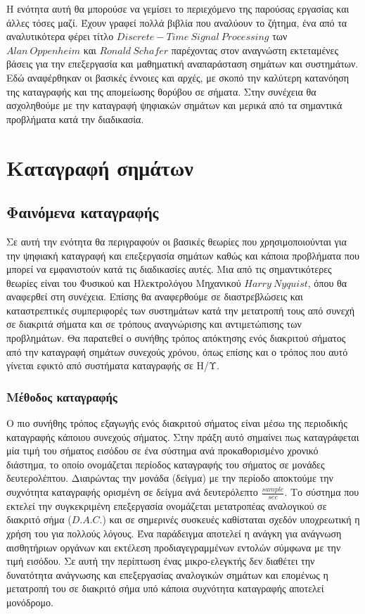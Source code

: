 \documentclass[breaklines=true, 12pt]{article}
\begin{document}
Η ενότητα αυτή θα μπορούσε να γεμίσει το περιεχόμενο της παρούσας εργασίας
και άλλες τόσες μαζί. Έχουν γραφεί πολλά βιβλία που αναλύουν το ζήτημα, ένα
από τα αναλυτικότερα φέρει τίτλο \(Discrete-Time\ Signal\ Processing\) των \(Alan\ Oppenheim\) και
\(Ronald\ Schafer\) παρέχοντας στον αναγνώστη εκτεταμένες βάσεις για την επεξεργασία
και μαθηματική αναπαράσταση σημάτων και συστημάτων. Εδώ αναφέρθηκαν οι βασικές
έννοιες και αρχές, με σκοπό την καλύτερη κατανόηση της καταγραφής και της
απομείωσης θορύβου σε σήματα. Στην συνέχεια θα ασχοληθούμε με την καταγραφή
ψηφιακών σημάτων και μερικά από τα σημαντικά προβλήματα κατά την διαδικασία.
\section{Καταγραφή σημάτων}
\label{sec:orgeb927ef}
\subsection{Φαινόμενα καταγραφής}
\label{sec:orge0922b4}
    Σε αυτή την ενότητα θα περιγραφούν οι βασικές θεωρίες που χρησιμοποιούνται
για την ψηφιακή καταγραφή και επεξεργασία σημάτων καθώς και κάποια προβλήματα
που μπορεί να εμφανιστούν κατά τις διαδικασίες αυτές. Μια από τις σημαντικότερες
θεωρίες είναι του Φυσικού και Ηλεκτρολόγου Μηχανικού \(Harry\ Nyquist\),
όπου θα αναφερθεί στη συνέχεια. Επίσης θα αναφερθούμε σε διαστρεβλώσεις
και καταστρεπτικές συμπεριφορές των συστημάτων κατά την μετατροπή τους από
συνεχή σε διακριτά σήματα και σε τρόπους αναγνώρισης και αντιμετώπισης
των προβλημάτων. Θα παρατεθεί ο συνήθης τρόπος απόκτησης ενός διακριτού σήματος
από την καταγραφή σημάτων συνεχούς χρόνου, όπως επίσης και ο τρόπος που αυτό γίνεται
εφικτό από συστήματα καταγραφής σε Η/Υ.
\subsubsection{Μέθοδος καταγραφής}
\label{sec:org98b206d}
Ο πιο συνήθης τρόπος εξαγωγής ενός διακριτού σήματος είναι μέσω της περιοδικής
καταγραφής κάποιου συνεχούς σήματος. Στην πράξη αυτό σημαίνει πως καταγράφεται
μία τιμή του σήματος εισόδου σε ένα σύστημα ανά προκαθορισμένο χρονικό διάστημα,
το οποίο ονομάζεται περίοδος καταγραφής του σήματος σε μονάδες δευτερολέπτου.
Διαιρώντας την μονάδα (δείγμα) με την περίοδο αποκτούμε την συχνότητα καταγραφής ορισμένη
σε δείγμα ανά δευτερόλεπτο \(\displaystyle \frac{sample}{sec}\). Το σύστημα που εκτελεί την συγκεκριμένη
επεξεργασία ονομάζεται μετατροπέας αναλογικού σε διακριτό σήμα (\(D.A.C.\))
και σε σημερινές συσκευές καθίσταται σχεδόν υποχρεωτική η χρήση του για
πολλούς λόγους. Ένα παράδειγμα αποτελεί η ανάγκη για ανάγνωση αισθητήριων
οργάνων και εκτέλεση προδιαγεγραμμένων εντολών σύμφωνα με την τιμή εισόδου.
Σε αυτή την περίπτωση ένας μικρο-ελεγκτής δεν διαθέτει την δυνατότητα
ανάγνωσης και επεξεργασίας αναλογικών σημάτων και επομένως η μετατροπή του
σε διακριτό σήμα υπό κάποια συχνότητα καταγραφής αποτελεί μονόδρομο.
\end{document}
